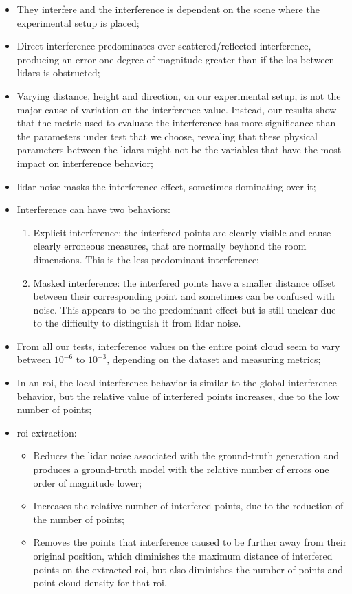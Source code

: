 \begin{itemize}
	\item They interfere and the interference is dependent on the scene where the experimental setup is placed;
	\item Direct interference predominates over scattered/reflected interference, producing an error one degree of magnitude greater than if the \ac{los} between \acp{lidar} is obstructed; %
	\item Varying distance, height and direction, on our experimental setup, is not the major cause of variation on the interference value. Instead, our results show that the metric used to evaluate the interference has more significance than the parameters under test that we choose, revealing that these physical parameters between the \acp{lidar} might not be the variables that have the most impact on interference behavior;
	\item \ac{lidar} noise masks the interference effect, sometimes dominating over it;
	\item Interference can have two behaviors: 
		\begin{enumerate}
			\item Explicit interference: the interfered points are clearly visible and cause clearly erroneous measures, that are normally beyhond the room dimensions. This is the less predominant interference;
			\item Masked interference: the interfered points have a smaller distance offset between their corresponding point and sometimes can be confused with noise. This appears to be the predominant effect but is still unclear due to the difficulty to distinguish it from \ac{lidar} noise.
		\end{enumerate}
	\item From all our tests, interference values on the entire point cloud seem to vary between $10^{-6}$ to $10^{-3}$, depending on the dataset and measuring metrics;
	\item In an \ac{roi}, the local interference behavior is similar to the global interference behavior, but the relative value of interfered points increases, due to the low number of points;
	\item \ac{roi} extraction:
		\begin{itemize}
			\item Reduces the \ac{lidar} noise associated with the ground-truth generation and produces a ground-truth model with the relative number of errors one order of magnitude lower;
			\item Increases the relative number of interfered points, due to the reduction of the number of points;
			\item Removes the points that interference caused to be further away from their original position, which diminishes the maximum distance of interfered points on the extracted \ac{roi}, but also diminishes the number of points and point cloud density for that \ac{roi}.
			\end{itemize} 
\end{itemize}

